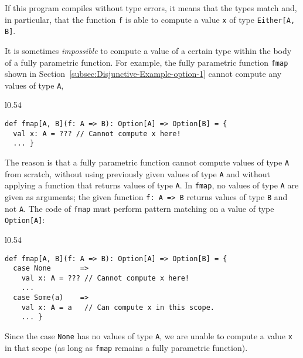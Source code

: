 \noindent If this program compiles without type errors, it means that
the types match and, in particular, that the function \lstinline!f!
is able to compute a value \lstinline!x! of type \lstinline!Either[A, B]!.

It is sometimes \emph{impossible} to compute a value of a certain
type within the body of a fully parametric function. For example,
the fully parametric function \lstinline!fmap! shown in Section~\ref{subsec:Disjunctive-Example-option-1}
cannot compute any values of type \lstinline!A!,

\begin{wrapfigure}{l}{0.54\columnwidth}%
\vspace{-0.65\baselineskip}
\begin{lstlisting}
def fmap[A, B](f: A => B): Option[A] => Option[B] = {
  val x: A = ??? // Cannot compute x here!
  ... }
\end{lstlisting}

\vspace{-0.9\baselineskip}
\end{wrapfigure}%

\noindent The reason is that a fully parametric function cannot compute
values of type \lstinline!A! from scratch, without using previously
given values of type \lstinline!A! and without applying a function
that returns values of type \lstinline!A!. In \lstinline!fmap!,
no values of type \lstinline!A! are given as arguments; the given
function \lstinline!f: A => B! returns values of type \lstinline!B!
and not \lstinline!A!. The code of \lstinline!fmap! must perform
pattern matching on a value of type \lstinline!Option[A]!:

\begin{wrapfigure}{l}{0.54\columnwidth}%
\vspace{-0.65\baselineskip}
\begin{lstlisting}
def fmap[A, B](f: A => B): Option[A] => Option[B] = {
  case None       => 
    val x: A = ??? // Cannot compute x here!
    ...
  case Some(a)    =>
    val x: A = a   // Can compute x in this scope.
    ... }
\end{lstlisting}

\vspace{-0.9\baselineskip}
\end{wrapfigure}%

\noindent Since the case \lstinline!None! has no values of type \lstinline!A!,
we are unable to compute a value \lstinline!x! in that scope (as
long as \lstinline!fmap! remains a fully parametric function). 

